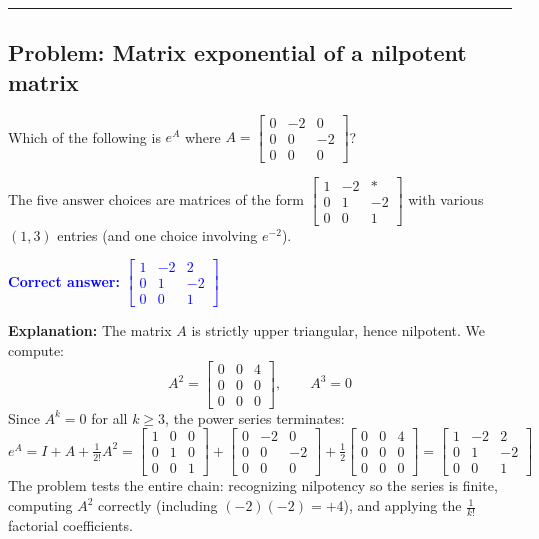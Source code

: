 \documentclass[12pt]{amsart}
\newcommand{\divider}{
  \vspace{-1em}
  \noindent
  \raisebox{-0.15ex}{\textbullet}%
  \hspace{0.5em}%
  \rule[0.5ex]{0.95\textwidth}{1.0pt}%
  \hspace{0.5em}%
  \raisebox{-0.15ex}{\textbullet}%
  \vspace{0em}
}
\begin{document}
\divider

\subsection*{Problem: Matrix exponential of a nilpotent matrix}

Which of the following is $e^{A}$ where
$A = \begin{bmatrix} 0 & -2 & 0 \\ 0 & 0 & -2 \\ 0 & 0 & 0 \end{bmatrix}$?

\noindent
The five answer choices are matrices of the form
$\begin{bmatrix} 1 & -2 & * \\ 0 & 1 & -2 \\ 0 & 0 & 1 \end{bmatrix}$
with various $(1,3)$ entries (and one choice involving $e^{-2}$).

\textcolor{blue}{\textbf{Correct answer:}
$\begin{bmatrix} 1 & -2 & 2 \\ 0 & 1 & -2 \\ 0 & 0 & 1 \end{bmatrix}$}

\textbf{Explanation:}
The matrix $A$ is strictly upper triangular, hence nilpotent.
We compute:
$$A^2 = \begin{bmatrix} 0 & 0 & 4 \\ 0 & 0 & 0 \\ 0 & 0 & 0 \end{bmatrix},
\qquad A^3 = 0$$
Since $A^k = 0$ for all $k \geq 3$, the power series terminates:
$$e^A = I + A + \tfrac{1}{2!}A^2
     = \begin{bmatrix} 1&0&0\\0&1&0\\0&0&1 \end{bmatrix}
     + \begin{bmatrix} 0&-2&0\\0&0&-2\\0&0&0 \end{bmatrix}
     + \tfrac{1}{2}\begin{bmatrix} 0&0&4\\0&0&0\\0&0&0 \end{bmatrix}
     = \begin{bmatrix} 1&-2&2\\0&1&-2\\0&0&1 \end{bmatrix}$$
The problem tests the entire chain: recognizing nilpotency so the series
is finite, computing $A^2$ correctly (including $(-2)(-2) = +4$), and
applying the $\frac{1}{k!}$ factorial coefficients.
\end{document}
